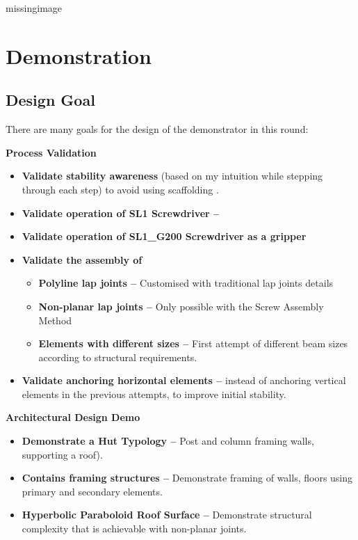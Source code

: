 missingimage

\section{Demonstration}
\label{section:exploration-4-demonstration}

\subsection{Design Goal}
\label{subsection:exploration-4-design-goal}

There are many goals for the design of the demonstrator in this round:

\textbf{Process Validation}
\begin{itemize}
    \item \textbf{Validate stability awareness} (based on my intuition while stepping through each step) to avoid using scaffolding .
    \item \textbf{Validate operation of SL1 Screwdriver --} 
    \item \textbf{Validate operation of SL1\_G200 Screwdriver as a gripper}
    \item \textbf{Validate the assembly of}
    \begin{itemize}
        \item \textbf{Polyline lap joints --} Customised with traditional lap joints details 
        \item \textbf{Non-planar lap joints --} Only possible with the Screw Assembly Method 
        \item \textbf{Elements with different sizes --} First attempt of different beam sizes according to structural requirements.
    \end{itemize}
    \item \textbf{Validate anchoring horizontal elements --} instead of anchoring vertical elements in the previous attempts, to improve initial stability.
\end{itemize}
\textbf{Architectural Design Demo}
\begin{itemize}
    \item \textbf{Demonstrate a Hut Typology --} Post and column framing walls, supporting a roof).
    \item \textbf{Contains framing structures --} Demonstrate framing of walls, floors using primary and secondary elements.
    \item \textbf{Hyperbolic Paraboloid Roof Surface --} Demonstrate structural complexity that is achievable with non-planar joints.
\end{itemize}

